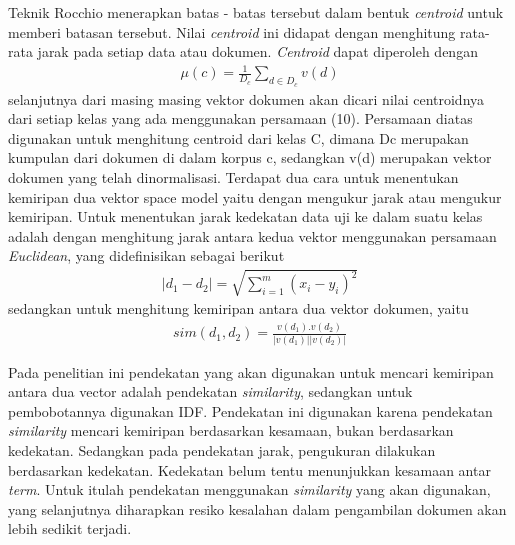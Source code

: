Teknik Rocchio menerapkan batas - batas tersebut dalam bentuk\textit{ centroid} untuk memberi batasan tersebut. Nilai \textit{centroid} ini didapat dengan menghitung rata- rata jarak pada setiap data atau dokumen. \textit{Centroid} dapat diperoleh dengan
\begin{equation}
\begin{split}
\mu (c) = \frac{1}{D_{c}} \sum \limits_{d\in D_c} v(d)
\label{eq:rociosatu}
\end{split}
\end{equation}
selanjutnya dari masing masing vektor dokumen akan dicari nilai centroidnya dari setiap kelas yang ada menggunakan persamaan (10). Persamaan diatas digunakan untuk menghitung centroid dari kelas C, dimana Dc merupakan kumpulan dari dokumen di dalam korpus c, sedangkan v(d) merupakan vektor dokumen yang telah dinormalisasi. Terdapat dua cara untuk menentukan kemiripan dua vektor space model yaitu dengan mengukur jarak atau mengukur kemiripan. Untuk menentukan jarak kedekatan data uji ke dalam suatu kelas adalah dengan menghitung jarak antara kedua vektor menggunakan persamaan \textit{Euclidean}, yang didefinisikan sebagai berikut
\begin{equation}
\begin{split}
|d_1 - d_2 | = \sqrt{\sum_{i=1}^{m}(x_i - y_i)^2}
\label{eq:rociodua}
\end{split}
\end{equation}
sedangkan untuk menghitung kemiripan antara dua vektor dokumen, yaitu
\begin{equation}
\begin{split}
sim(d_1, d_2) = \frac{v(d_1).v(d_2)}{|v(d_1)||v(d_2)|}
\label{eq:rociotiga}
\end{split}
\end{equation}

Pada penelitian ini pendekatan yang akan digunakan untuk mencari kemiripan antara dua vector adalah pendekatan \textit{similarity}, sedangkan untuk pembobotannya digunakan IDF. Pendekatan ini digunakan karena pendekatan \textit{similarity} mencari kemiripan berdasarkan kesamaan, bukan berdasarkan kedekatan. Sedangkan pada pendekatan jarak, pengukuran dilakukan berdasarkan kedekatan. Kedekatan belum tentu menunjukkan kesamaan antar \textit{term}. Untuk itulah pendekatan menggunakan \textit{similarity} yang akan digunakan, yang selanjutnya diharapkan resiko kesalahan dalam pengambilan dokumen akan lebih sedikit terjadi.

